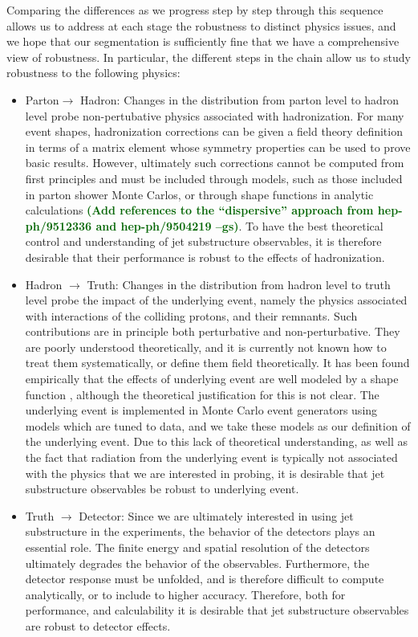 \documentclass[11pt,letterpaper]{article}
\newcommand{\gs}[1]{\textbf{\textcolor{darkgreen}{(#1 --gs)}}}
\begin{document}
Comparing the differences as we progress step by step through this sequence allows us to address at each stage the robustness to distinct physics issues, and we hope that our segmentation is sufficiently fine that we have a comprehensive view of robustness. In particular, the different steps in the chain allow us to study robustness to the following physics: 
\begin{itemize}
\item Parton$\to$ Hadron: Changes in the distribution from parton
  level to hadron level probe non-pertubative physics associated with
  hadronization. For many event shapes, hadronization corrections can
  be given a field theory definition in terms of a matrix element
  whose symmetry properties can be used to prove basic
  results. However, ultimately such corrections cannot be computed
  from first principles and must be included through models, such as
  those included in parton shower Monte Carlos, or through shape
  functions in analytic calculations
  \cite{Korchemsky:1999kt,Korchemsky:2000kp,Bosch:2004th,Hoang:2007vb,Ligeti:2008ac}
  \gs{Add references to the ``dispersive'' approach from
    hep-ph/9512336 and hep-ph/9504219}.  To have the best theoretical
  control and understanding of jet substructure observables, it is
  therefore desirable that their performance is robust to the effects
  of hadronization.
\item Hadron $\to$ Truth: Changes in the distribution from hadron level to truth level probe the impact of the underlying event, namely the physics associated with interactions of the colliding protons, and their remnants. Such contributions are in principle both perturbative and non-perturbative. They are poorly understood theoretically, and it is currently not known how to treat them systematically, or define them field theoretically. It has been found empirically that the effects of underlying event are well modeled by a shape function \cite{Stewart:2014nna}, although the theoretical justification for this is not clear.  The underlying event is implemented in Monte Carlo event generators using models which are tuned to data, and we take these models as our definition of the underlying event. Due to this lack of theoretical understanding, as well as the fact that radiation from the underlying event is typically not associated with the physics that we are interested in probing, it is desirable that jet substructure observables be robust to underlying event.
\item Truth $\to$ Detector: Since we are ultimately interested in using jet substructure in the experiments, the behavior of the detectors plays an essential role. The finite energy and spatial resolution of the detectors ultimately degrades the behavior of the observables. Furthermore, the detector response must be unfolded, and is therefore difficult to compute analytically, or to include to higher accuracy. Therefore, both for performance, and calculability it is desirable that jet substructure observables are robust to detector effects.

\end{itemize}
\end{document}
